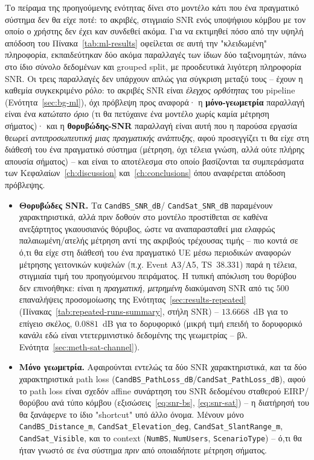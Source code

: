 Το πείραμα της προηγούμενης ενότητας δίνει στο μοντέλο κάτι που ένα
πραγματικό σύστημα δεν θα είχε ποτέ: το ακριβές, στιγμιαίο SNR ενός
υποψήφιου κόμβου με τον οποίο ο χρήστης δεν έχει καν συνδεθεί ακόμα. Για
να εκτιμηθεί πόσο από την υψηλή απόδοση του Πίνακα~\ref{tab:ml-results}
οφείλεται σε αυτή την "κλειδωμένη" πληροφορία, εκπαιδεύτηκαν δύο ακόμα
παραλλαγές των ίδιων δύο ταξινομητών, πάνω στο ίδιο σύνολο δεδομένων και
grouped split, με προοδευτικά λιγότερη πληροφορία SNR. Οι τρεις
παραλλαγές δεν υπάρχουν απλώς για σύγκριση μεταξύ τους -- έχουν η καθεμία
συγκεκριμένο ρόλο: το ακριβές SNR είναι \emph{έλεγχος ορθότητας} του
pipeline (Ενότητα~\ref{sec:bg-ml}), όχι πρόβλεψη προς αναφορά· η
\textbf{μόνο-γεωμετρία} παραλλαγή είναι ένα \emph{κατώτατο όριο} (τι θα
πετύχαινε ένα μοντέλο χωρίς καμία μέτρηση σήματος)· και η
\textbf{θορυβώδης-SNR} παραλλαγή είναι αυτή που η παρούσα εργασία θεωρεί
\emph{αντιπροσωπευτική μιας πραγματικής ανάπτυξης}, αφού προσεγγίζει τι θα
είχε στη διάθεσή του ένα πραγματικό σύστημα (μέτρηση, όχι τέλεια γνώση,
αλλά ούτε πλήρης απουσία σήματος) -- και είναι το αποτέλεσμα στο οποίο
βασίζονται τα συμπεράσματα των Κεφαλαίων~\ref{ch:discussion}
και~\ref{ch:conclusions} όπου αναφέρεται απόδοση πρόβλεψης.

\begin{itemize}
  \item \textbf{Θορυβώδες SNR.} Τα \texttt{CandBS\_SNR\_dB}/
    \texttt{CandSat\_SNR\_dB} παραμένουν χαρακτηριστικά, αλλά πριν
    δοθούν στο μοντέλο προστίθεται σε καθένα ανεξάρτητος γκαουσιανός
    θόρυβος, ώστε να αναπαρασταθεί μια ελαφρώς παλαιωμένη/ατελής μέτρηση
    αντί της ακριβούς τρέχουσας τιμής -- πιο κοντά σε ό,τι θα είχε στη
    διάθεσή του ένα πραγματικό UE μέσω περιοδικών αναφορών μέτρησης
    γειτονικών κυψελών (π.χ. Event A3/A5, TS~38.331) παρά η τέλεια,
    στιγμιαία τιμή του προηγούμενου πειράματος. Η τυπική απόκλιση του
    θορύβου δεν επινοήθηκε: είναι η \emph{πραγματική, μετρημένη}
    διακύμανση SNR από τις $500$ επαναλήψεις προσομοίωσης της
    Ενότητας~\ref{sec:results-repeated} (Πίνακας~\ref{tab:repeated-runs-summary},
    στήλη SNR) -- $13.6668$~dB για το επίγειο σκέλος, $0.0881$~dB για το
    δορυφορικό (μικρή τιμή επειδή το δορυφορικό κανάλι εδώ είναι
    ντετερμινιστικό δεδομένης της γεωμετρίας -- βλ.
    Ενότητα~\ref{sec:meth-sat-channel}).
  \item \textbf{Μόνο γεωμετρία.} Αφαιρούνται εντελώς τα δύο SNR
    χαρακτηριστικά, \emph{και} τα δύο χαρακτηριστικά path loss
    (\texttt{CandBS\_PathLoss\_dB}/\texttt{CandSat\_PathLoss\_dB}), αφού
    το path loss είναι σχεδόν affine συνάρτηση του SNR δεδομένου
    σταθερού EIRP/θορύβου ανά τύπο κόμβου (εξισώσεις~\eqref{eq:snr-bs},
    \eqref{eq:snr-sat}) -- η διατήρησή του θα ξανάφερνε το ίδιο
    "shortcut" υπό άλλο όνομα. Μένουν μόνο \texttt{CandBS\_Distance\_m},
    \texttt{CandSat\_Elevation\_deg}, \texttt{CandSat\_SlantRange\_m},
    \texttt{CandSat\_Visible}, και το context (\texttt{NumBS},
    \texttt{NumUsers}, \texttt{ScenarioType}) -- ό,τι θα ήταν γνωστό σε
    ένα σύστημα \emph{πριν} από οποιαδήποτε μέτρηση σήματος.
\end{itemize}

